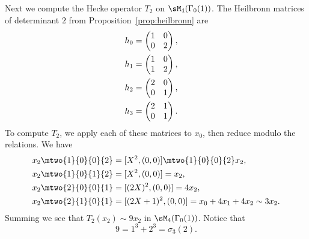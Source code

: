 \begin{example}
Next we compute the Hecke operator $T_2$ on $\sM_4(\Gamma_0(1))$.
The Heilbronn matrices
of determinant $2$ from Proposition~\ref{prop:heilbronn}
are
\begin{align*}
h_0&=\left(\begin{matrix}
\hfill{}1&\hfill{}0\\
\hfill{}0&\hfill{}2
\end{matrix}\right),\quad{}\\
h_1&=\left(\begin{matrix}
\hfill{}1&\hfill{}0\\
\hfill{}1&\hfill{}2
\end{matrix}\right),\quad{}\\
h_2&=\left(\begin{matrix}
\hfill{}2&\hfill{}0\\
\hfill{}0&\hfill{}1
\end{matrix}\right),\quad{}\\
h_3&=\left(\begin{matrix}
\hfill{}2&\hfill{}1\\
\hfill{}0&\hfill{}1
\end{matrix}\right).
\end{align*}
To compute $T_2$, we apply each of these matrices to $x_0$,
then reduce modulo the relations.
We have
\begin{align*}
  x_2\mtwo{1}{0}{0}{2} &= [X^2,(0,0)] \mtwo{1}{0}{0}{2}
         x_2,\\
  x_2 \mtwo{1}{0}{1}{2} &= [X^2,(0,0)] = x_2,\\
  x_2 \mtwo{2}{0}{0}{1} &= [(2X)^2,(0,0)] = 4x_2,\\
  x_2 \mtwo{2}{1}{0}{1} &= [(2X+1)^2,(0,0)] = x_0 + 4x_1 + 4x_2
                                            \sim 3x_2.
\end{align*}
Summing we see that $T_2(x_2) \sim 9x_2$ in $\sM_4(\Gamma_0(1))$.
Notice that 
$$9=1^3+2^3 = \sigma_3(2).$$


\end{example}
